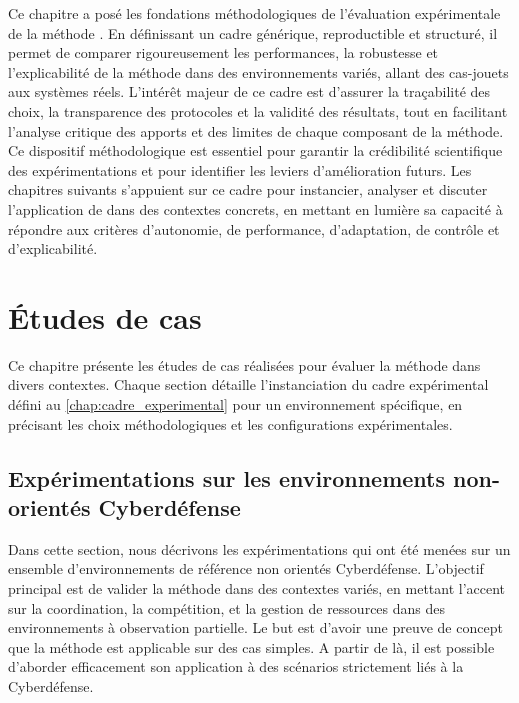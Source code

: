 Ce chapitre a posé les fondations méthodologiques de l'évaluation expérimentale de la méthode . En définissant un cadre générique, reproductible et structuré, il permet de comparer rigoureusement les performances, la robustesse et l'explicabilité de la méthode dans des environnements variés, allant des cas-jouets aux systèmes réels. L'intérêt majeur de ce cadre est d'assurer la traçabilité des choix, la transparence des protocoles et la validité des résultats, tout en facilitant l'analyse critique des apports et des limites de chaque composant de la méthode. Ce dispositif méthodologique est essentiel pour garantir la crédibilité scientifique des expérimentations et pour identifier les leviers d'amélioration futurs. Les chapitres suivants s'appuient sur ce cadre pour instancier, analyser et discuter l'application de  dans des contextes concrets, en mettant en lumière sa capacité à répondre aux critères d'autonomie, de performance, d'adaptation, de contrôle et d'explicabilité.


\clearpage
\thispagestyle{empty}
\null
\newpage


\chapter{Études de cas}
\label{chap:case_studies}

Ce chapitre présente les études de cas réalisées pour évaluer la méthode  dans divers contextes. Chaque section détaille l'instanciation du cadre expérimental défini au \autoref{chap:cadre_experimental} pour un environnement spécifique, en précisant les choix méthodologiques et les configurations expérimentales.

\section{Expérimentations sur les environnements non-orientés Cyberdéfense}

Dans cette section, nous décrivons les expérimentations qui ont été menées sur un ensemble d'environnements de référence non orientés Cyberdéfense. L'objectif principal est de valider la méthode  dans des contextes variés, en mettant l'accent sur la coordination, la compétition, et la gestion de ressources dans des environnements à observation partielle. Le but est d'avoir une preuve de concept que la méthode  est applicable sur des cas simples. A partir de là, il est possible d'aborder efficacement son application à des scénarios strictement liés à la Cyberdéfense.

